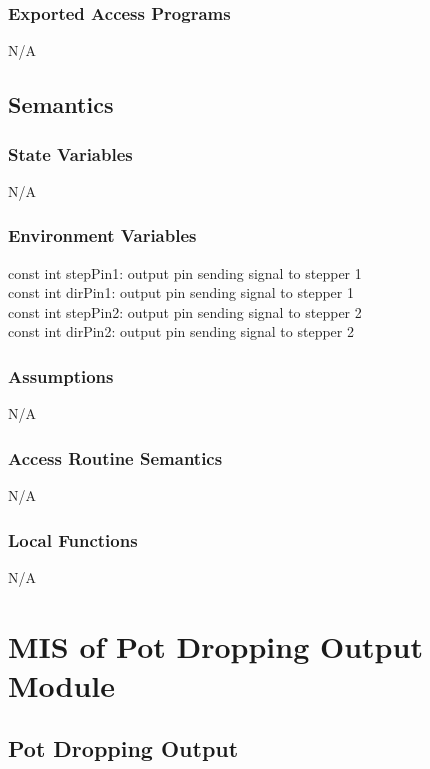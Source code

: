\documentclass[12pt, titlepage]{article}
\begin{document}
\subsubsection{Exported Access Programs}
N/A

\subsection{Semantics}

\subsubsection{State Variables}

N/A

\subsubsection{Environment Variables}

const int stepPin1: output pin sending signal to stepper 1\\
const int dirPin1: output pin sending signal to stepper 1\\
const int stepPin2: output pin sending signal to stepper 2\\
const int dirPin2: output pin sending signal to stepper 2\\
\subsubsection{Assumptions}

N/A

\subsubsection{Access Routine Semantics}

N/A

\subsubsection{Local Functions}

N/A

\section{MIS of Pot Dropping Output Module} \label{potdroppingOutput} 



\subsection{Pot Dropping Output}
\end{document}
